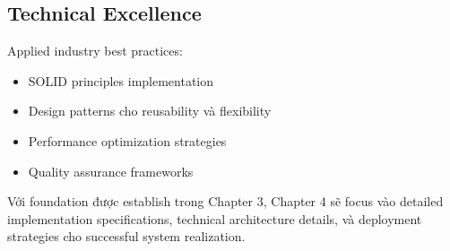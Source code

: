 \subsection{Technical Excellence}

Applied industry best practices:
\begin{itemize}
    \item SOLID principles implementation
    \item Design patterns cho reusability và flexibility
    \item Performance optimization strategies
    \item Quality assurance frameworks
\end{itemize}

Với foundation được establish trong Chapter 3, Chapter 4 sẽ focus vào detailed implementation specifications, technical architecture details, và deployment strategies cho successful system realization.
